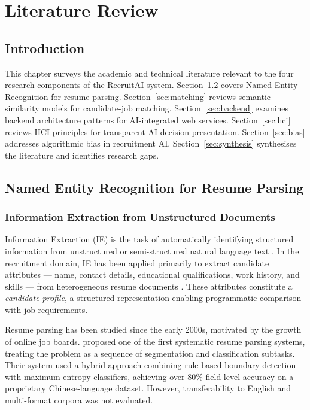 \chapter{Literature Review}

\section{Introduction}

This chapter surveys the academic and technical literature relevant to the four research components of the RecruitAI system. Section~\ref{sec:ner} covers Named Entity Recognition for resume parsing. Section~\ref{sec:matching} reviews semantic similarity models for candidate-job matching. Section~\ref{sec:backend} examines backend architecture patterns for AI-integrated web services. Section~\ref{sec:hci} reviews HCI principles for transparent AI decision presentation. Section~\ref{sec:bias} addresses algorithmic bias in recruitment AI. Section~\ref{sec:synthesis} synthesises the literature and identifies research gaps.

\section{Named Entity Recognition for Resume Parsing}
\label{sec:ner}

\subsection{Information Extraction from Unstructured Documents}

Information Extraction (IE) is the task of automatically identifying structured information from unstructured or semi-structured natural language text \citep{Cowie1996}. In the recruitment domain, IE has been applied primarily to extract candidate attributes --- name, contact details, educational qualifications, work history, and skills --- from heterogeneous resume documents \citep{Yu2005}. These attributes constitute a \textit{candidate profile}, a structured representation enabling programmatic comparison with job requirements.

Resume parsing has been studied since the early 2000s, motivated by the growth of online job boards. \citet{Yu2005} proposed one of the first systematic resume parsing systems, treating the problem as a sequence of segmentation and classification subtasks. Their system used a hybrid approach combining rule-based boundary detection with maximum entropy classifiers, achieving over 80\% field-level accuracy on a proprietary Chinese-language dataset. However, transferability to English and multi-format corpora was not evaluated.

